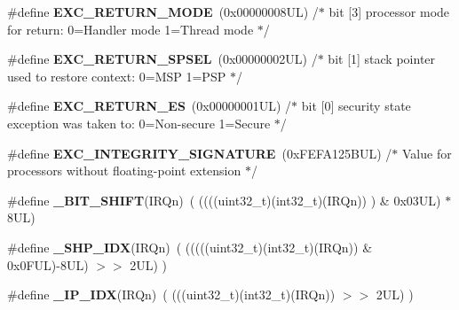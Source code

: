 \begin{DoxyCompactItemize}
\#define {\bfseries E\+X\+C\+\_\+\+R\+E\+T\+U\+R\+N\+\_\+\+M\+O\+DE}~(0x00000008\+U\+L)     /$\ast$ bit \mbox{[}3\mbox{]} processor mode for return\+: 0=\+Handler mode 1=\+Thread mode      $\ast$/
\item 
\mbox{\label{group___c_m_s_i_s___core___n_v_i_c_functions_ga686922b26c29eac540f53a6213627466}} 
\#define {\bfseries E\+X\+C\+\_\+\+R\+E\+T\+U\+R\+N\+\_\+\+S\+P\+S\+EL}~(0x00000002\+U\+L)     /$\ast$ bit \mbox{[}1\mbox{]} stack pointer used to restore context\+: 0=\+M\+S\+P 1=\+P\+S\+P           $\ast$/
\item 
\mbox{\label{group___c_m_s_i_s___core___n_v_i_c_functions_gac939dbf69d3063c76a28516a4ae84db7}} 
\#define {\bfseries E\+X\+C\+\_\+\+R\+E\+T\+U\+R\+N\+\_\+\+ES}~(0x00000001\+U\+L)     /$\ast$ bit \mbox{[}0\mbox{]} security state exception was taken to\+: 0=\+Non-\/secure 1=\+Secure $\ast$/
\item 
\mbox{\label{group___c_m_s_i_s___core___n_v_i_c_functions_ga7d1b21b2d863ccd9e23a3295b3173155}} 
\#define {\bfseries E\+X\+C\+\_\+\+I\+N\+T\+E\+G\+R\+I\+T\+Y\+\_\+\+S\+I\+G\+N\+A\+T\+U\+RE}~(0x\+F\+E\+F\+A125\+B\+U\+L)     /$\ast$ Value for processors without floating-\/point extension                $\ast$/
\item 
\mbox{\label{group___c_m_s_i_s___core___n_v_i_c_functions_ga53c75b28823441c6153269f0ecbed878}} 
\#define {\bfseries \+\_\+\+B\+I\+T\+\_\+\+S\+H\+I\+FT}(I\+R\+Qn)~(  ((((uint32\+\_\+t)(int32\+\_\+t)(I\+R\+Qn))         )      \&  0x03\+U\+L) $\ast$ 8\+U\+L)
\item 
\mbox{\label{group___c_m_s_i_s___core___n_v_i_c_functions_gaee4f7eb5d7e770ad51489dbceabb1755}} 
\#define {\bfseries \+\_\+\+S\+H\+P\+\_\+\+I\+DX}(I\+R\+Qn)~( (((((uint32\+\_\+t)(int32\+\_\+t)(I\+R\+Qn)) \& 0x0\+F\+U\+L)-\/8\+U\+L) $>$$>$    2\+U\+L)      )
\item 
\mbox{\label{group___c_m_s_i_s___core___n_v_i_c_functions_ga370ec4b1751a6a889d849747df3763a9}} 
\#define {\bfseries \+\_\+\+I\+P\+\_\+\+I\+DX}(I\+R\+Qn)~(   (((uint32\+\_\+t)(int32\+\_\+t)(I\+R\+Qn))                $>$$>$    2\+U\+L)      )

\end{DoxyCompactItemize}

